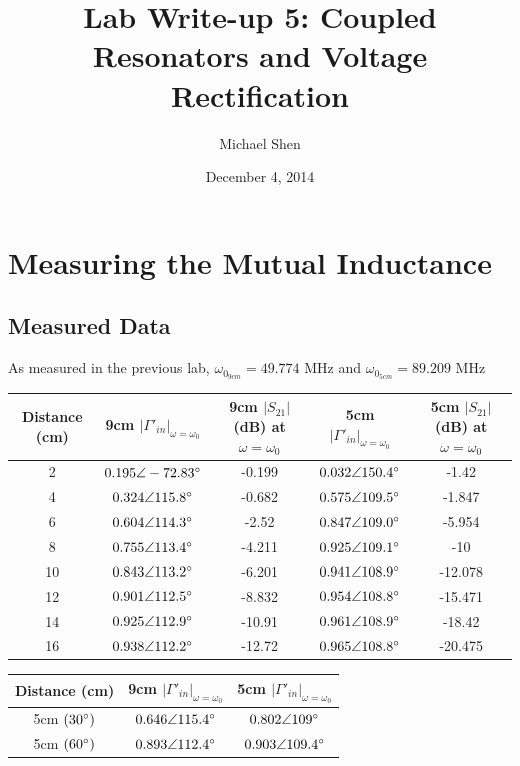 \documentclass{article}
\begin{document}
\title{Lab Write-up 5: Coupled Resonators and Voltage Rectification}
\author{Michael Shen}
\date{December 4, 2014}
\maketitle


\section{Measuring the Mutual Inductance}

\subsection{Measured Data}
As measured in the previous lab, $\omega_{0_{9cm}} = 49.774$ MHz and $\omega_{0_{5cm}} = 89.209$ MHz

\begin{table}[H]
\centering
\begin{tabular}{|c|c|c|c|c|}
\hline
Distance (cm)& 9cm $\vert\Gamma '_{in}\vert_{\omega=\omega_0}$     
			 & 9cm $\vert S_{21}\vert$ (dB) at $\omega = \omega_0$
			 & 5cm $\vert\Gamma '_{in}\vert_{\omega=\omega_0}$     
			 & 5cm $\vert S_{21}\vert$ (dB) at $\omega = \omega_0$ \\ \hline
2   		 & $0.195\angle-72.83\degree$ & -0.199 & $0.032\angle150.4\degree$  & -1.42   \\ \hline
4   	 	 & $0.324\angle115.8\degree$  & -0.682 & $0.575\angle109.5\degree$  & -1.847  \\ \hline
6   	 	 & $0.604\angle114.3\degree$  & -2.52  & $0.847\angle109.0\degree$  & -5.954  \\ \hline
8		     & $0.755\angle113.4\degree$  & -4.211 & $0.925\angle109.1\degree$  & -10     \\ \hline
10  		 & $0.843\angle113.2\degree$  & -6.201 & $0.941\angle108.9\degree$  & -12.078 \\ \hline
12 			 & $0.901\angle112.5\degree$  & -8.832 & $0.954\angle108.8\degree$  & -15.471 \\ \hline
14 			 & $0.925\angle112.9\degree$  & -10.91 & $0.961\angle108.9\degree$  & -18.42  \\ \hline
16  		 & $0.938\angle112.2\degree$  & -12.72 & $0.965\angle108.8\degree$  & -20.475 \\ \hline
\end{tabular}
\end{table}

\begin{table}[h]
\centering
\begin{tabular}{|c|c|c|}
\hline
Distance (cm)	  & 9cm $\vert\Gamma '_{in}\vert_{\omega=\omega_0}$      
			 	  & 5cm $\vert\Gamma '_{in}\vert_{\omega=\omega_0}$ \\ \hline
5cm $(30\degree)$ & $0.646\angle115.4\degree$ & $0.802\angle109\degree$   \\ \hline
5cm $(60\degree)$ & $0.893\angle112.4\degree$ & $0.903\angle109.4\degree$ \\ \hline
\end{tabular}
\end{table}
\end{document}
